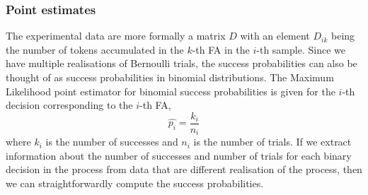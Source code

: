 \subsubsection{Point estimates}
The experimental data are more formally a matrix $D$ with an element $D_{ik}$ being
the number of tokens accumulated in the $k$-th FA in the $i$-th
sample. Since we have multiple
realisations of Bernoulli trials, the success probabilities can also be
thought of as success probabilities in binomial distributions. The
Maximum Likelihood point estimator for binomial success probabilities
is given for the $i$-th decision corresponding to the $i$-th FA,
\begin{equation*}
\hat{p_i} = \frac{k_i}{n_i}
\end{equation*}
where $k_i$ is the number of successes and $n_i$ is the number of
trials. If we extract information about the number of successes and
number of trials for each binary decision in the process from data
that are different realisation of the process, then we can
straightforwardly compute the success probabilities.

